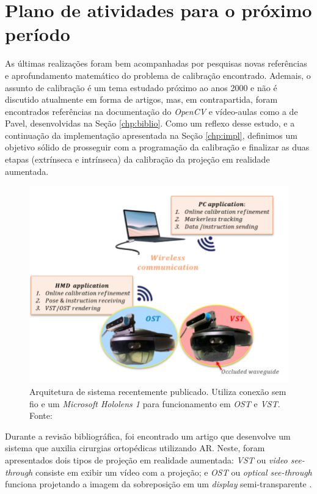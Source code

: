 \chapter{Plano de atividades para o próximo período}\label{chp:plano}

As últimas realizações foram bem acompanhadas por pesquisas novas referências e aprofundamento matemático do problema de calibração encontrado. Ademais, o assunto de calibração é um tema estudado próximo ao anos 2000 e não é discutido atualmente em forma de artigos, mas, em contrapartida, foram encontrados referências na documentação do \textit{OpenCV} e vídeo-aulas como a de Pavel, desenvolvidas na Seção \ref{chp:biblio}. Como um reflexo desse estudo, e a continuação da implementação apresentada na Seção \ref{chp:impl}, definimos um objetivo sólido de prosseguir com a programação da calibração e finalizar as duas etapas (extrínseca e intrínseca) da calibração da projeção em realidade aumentada.

\begin{figure}[H]
   \centering
   \includegraphics[width=.7\linewidth]{figuras/cutoloSys.png}
   \caption{Arquitetura de sistema recentemente publicado. Utiliza conexão sem fio e um \textit{Microsoft Hololens 1} para funcionamento em \textit{OST} e \textit{VST}. Fonte: \cite{Hu2022}}
   \label{fig:cutolo}
\end{figure}

Durante a revisão bibliográfica, foi encontrado um artigo que desenvolve um sistema que auxilia cirurgias ortopédicas utilizando AR. Neste, foram apresentados dois tipos de projeção em realidade aumentada: \textit{VST} ou \textit{video see-through} consiste em exibir um vídeo com a projeção; e \textit{OST} ou \textit{optical see-through} funciona projetando a imagem da sobreposição em um \textit{display} semi-transparente \cite{Hu2022}. 

